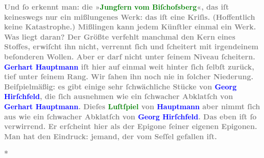 \pstart
           \noindent{}\textcolor{gray}{\textbf{Und ſo erkennt man: die »\textcolor{green}{Jungfern vom Biſchofsberg}{}\ledrightnote{\textcolor{green}{Die Jungfern vom Bischofsberg. Lustspiel}}«, das iſt keineswegs nur ein mißlungenes Werk:
                  das iſt eine Kriſis. (Hoffentlich keine Katastrophe.) Mißlingen kann jedem
                  Künſtler einmal ein Werk. Was liegt daran? Der Größte verfehlt manchmal den Kern
                  eines Stoffes, erwiſcht ihn nicht, verrennt ſich und ſcheitert mit irgendeinem
                  beſonderen Wollen. Aber er darf nicht unter ſeinem Niveau ſcheitern. \textcolor{blue}{Gerhart Hauptmann}{}\ledrightnote{\textcolor{blue}{Gerhart Hauptmann}} iſt hier auf einmal weit
                  hinter ſich ſelbſt zurück, tief unter ſeinem Rang. Wir ſahen ihn noch nie in
                  ſolcher Niederung. Beiſpielmäßig: es gibt einige sehr ſchwächliche Stücke von \textcolor{blue}{Georg Hirſchfeld}{}\ledrightnote{\textcolor{blue}{Georg Hirschfeld}}, die ſich ausnehmen wie ein
                  ſchwacher Abklatſch von \textcolor{blue}{Gerhart Hauptmann}{}\ledrightnote{\textcolor{blue}{Gerhart Hauptmann}}.
                  Dieſes \textcolor{green}{Luſtſpiel}{}\ledrightnote{{$\rightarrow$}\textcolor{green}{Die Jungfern vom Bischofsberg. Lustspiel}} von \textcolor{blue}{Hauptmann}{}\ledrightnote{\textcolor{blue}{Gerhart Hauptmann}} aber nimmt ſich aus wie ein
                  ſchwacher Abklatſch von \textcolor{blue}{Georg Hirſchfeld}{}\ledrightnote{\textcolor{blue}{Georg Hirschfeld}}.
                  Das eben iſt ſo verwirrend. Er erſcheint hier als der Epigone ſeiner eigenen
                  Epigonen. Man hat den Eindruck: jemand, der vom Seſſel gefallen iſt.}}\pend
           
\pstart
           \centering{}\textcolor{gray}{\textbf{*}}\pend
           
